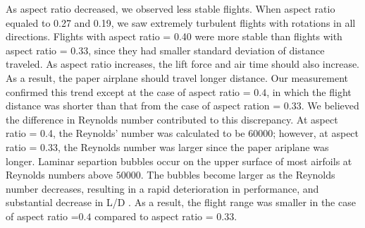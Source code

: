 As aspect ratio decreased, we observed less stable flights. When aspect ratio equaled to 0.27 and 0.19, we saw extremely turbulent flights with rotations in all directions. Flights with aspect ratio = 0.40 were more stable than flights with aspect ratio = 0.33, since they had smaller standard deviation of distance traveled. As aspect ratio increases, the lift force and air time should also increase. As a result, the paper airplane should travel longer distance. Our measurement confirmed this trend except at the case of aspect ratio = $0.4$, in which the flight distance was shorter than that from the case of aspect ration = $0.33$. We believed the difference in Reynolds number contributed to this discrepancy. At aspect ratio = 0.4, the Reynolds' number was calculated to be 
$60000$; however, at aspect ratio = 0.33, the Reynolds number was larger since the paper ariplane was longer. Laminar separtion bubbles occur on the upper surface of most airfoils at Reynolds numbers above $50000$. The bubbles become larger as the Reynolds number decreases, resulting in a rapid deterioration in performance, and substantial decrease in L/D \cite{mueller}. As a result, the flight range was smaller in the case of aspect ratio =$0.4$ compared to aspect ratio = $0.33$. 

  